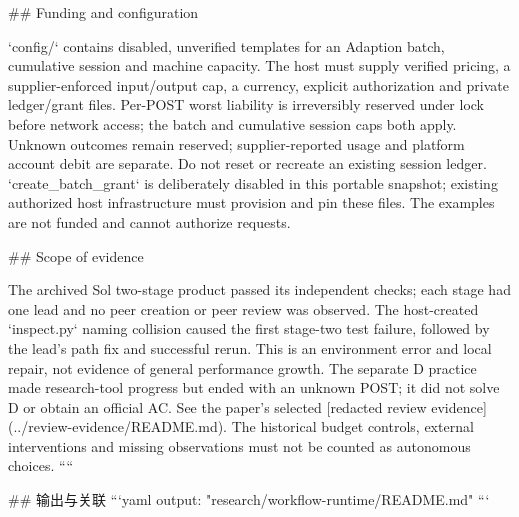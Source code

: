 ## Funding and configuration

`config/` contains disabled, unverified templates for an Adaption batch, cumulative session and machine capacity. The host must supply verified pricing, a supplier-enforced input/output cap, a currency, explicit authorization and private ledger/grant files. Per-POST worst liability is irreversibly reserved under lock before network access; the batch and cumulative session caps both apply. Unknown outcomes remain reserved; supplier-reported usage and platform account debit are separate. Do not reset or recreate an existing session ledger. `create_batch_grant` is deliberately disabled in this portable snapshot; existing authorized host infrastructure must provision and pin these files. The examples are not funded and cannot authorize requests.

## Scope of evidence

The archived Sol two-stage product passed its independent checks; each stage had one lead and no peer creation or peer review was observed. The host-created `inspect.py` naming collision caused the first stage-two test failure, followed by the lead's path fix and successful rerun. This is an environment error and local repair, not evidence of general performance growth. The separate D practice made research-tool progress but ended with an unknown POST; it did not solve D or obtain an official AC. See the paper's selected [redacted review evidence](../review-evidence/README.md). The historical budget controls, external interventions and missing observations must not be counted as autonomous choices.
````

## 输出与关联
```yaml
output: "research/workflow-runtime/README.md"
```
